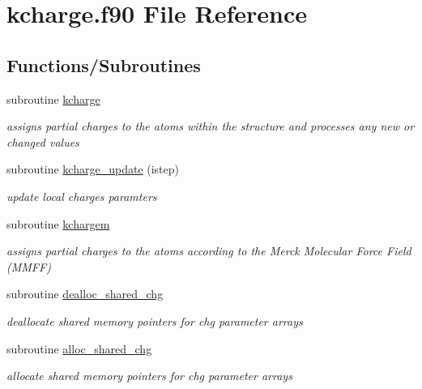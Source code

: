 \hypertarget{kcharge_8f90}{\section{kcharge.\-f90 File Reference}
\label{kcharge_8f90}
}
\subsection*{Functions/\-Subroutines}
\begin{DoxyCompactItemize}
\item 
subroutine \hyperlink{kcharge_8f90_a12856ab5c59d27d019b5309504b960d0}{kcharge}
\begin{DoxyCompactList}\small\item\em assigns partial charges to the atoms within the structure and processes any new or changed values \end{DoxyCompactList}\item 
subroutine \hyperlink{kcharge_8f90_a8acf8eceb78ec6488c2bfff2a7009761}{kcharge\-\_\-update} (istep)
\begin{DoxyCompactList}\small\item\em update local charges paramters \end{DoxyCompactList}\item 
subroutine \hyperlink{kcharge_8f90_a0e74762005202bfa98105408ee374e66}{kchargem}
\begin{DoxyCompactList}\small\item\em assigns partial charges to the atoms according to the Merck Molecular Force Field (M\-M\-F\-F) \end{DoxyCompactList}\item 
subroutine \hyperlink{kcharge_8f90_ab7bf95215bd2aa286b3682380d588fe3}{dealloc\-\_\-shared\-\_\-chg}
\begin{DoxyCompactList}\small\item\em deallocate shared memory pointers for chg parameter arrays \end{DoxyCompactList}\item 
subroutine \hyperlink{kcharge_8f90_a32d5633479c0f3b4ccf38837a96ce2e1}{alloc\-\_\-shared\-\_\-chg}
\begin{DoxyCompactList}\small\item\em allocate shared memory pointers for chg parameter arrays \end{DoxyCompactList}\end{DoxyCompactItemize}


